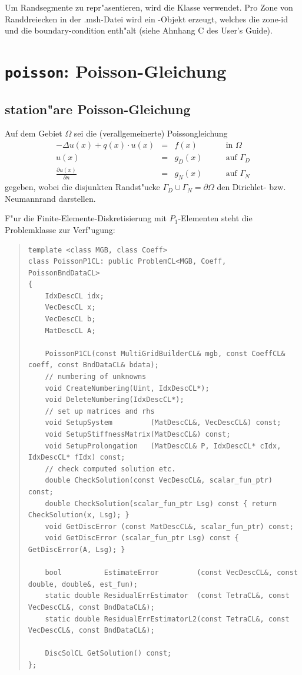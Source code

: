\documentclass[11pt,a4paper]{article}
\newenvironment{Code}{\begin{quote}\scriptsize}{\end{quote}}
\begin{document}
Um Randsegmente zu repr"asentieren, wird die Klasse  verwendet.
Pro Zone von Randdreiecken in der .msh-Datei wird ein -Objekt
erzeugt, welches die zone-id und die boundary-condition enth"alt (siehe Ahnhang C des
User's Guide).

\section{{\tt poisson}: Poisson-Gleichung}

\subsection{station"are Poisson-Gleichung}

Auf dem Gebiet $\Omega$ sei die (verallgemeinerte) Poissongleichung
\[
\begin{array}{rcll}
    -\Delta u(x) + q(x)\cdot u(x) &=& f(x) & \qquad\mbox{in }\Omega\\
    u(x) &=& g_D(x) & \qquad\mbox{auf }\Gamma_D\\
    \frac{\partial u(x)}{\partial n} &=& g_N(x) & \qquad\mbox{auf }\Gamma_N
\end{array}
\]
gegeben, wobei die disjunkten Randst"ucke $\Gamma_D\cup\Gamma_N=\partial\Omega$
den Dirichlet- bzw. Neumannrand darstellen.

F"ur die Finite-Elemente-Diskretisierung mit $P_1$-Elementen steht die
Problemklasse  zur Verf"ugung:
\begin{Code}
\begin{verbatim}
template <class MGB, class Coeff>
class PoissonP1CL: public ProblemCL<MGB, Coeff, PoissonBndDataCL>
{
    IdxDescCL idx;
    VecDescCL x;
    VecDescCL b;
    MatDescCL A;
    
    PoissonP1CL(const MultiGridBuilderCL& mgb, const CoeffCL& coeff, const BndDataCL& bdata);
    // numbering of unknowns
    void CreateNumbering(Uint, IdxDescCL*);
    void DeleteNumbering(IdxDescCL*);
    // set up matrices and rhs
    void SetupSystem         (MatDescCL&, VecDescCL&) const;
    void SetupStiffnessMatrix(MatDescCL&) const;
    void SetupProlongation   (MatDescCL& P, IdxDescCL* cIdx, IdxDescCL* fIdx) const;
    // check computed solution etc.
    double CheckSolution(const VecDescCL&, scalar_fun_ptr) const;
    double CheckSolution(scalar_fun_ptr Lsg) const { return CheckSolution(x, Lsg); }
    void GetDiscError (const MatDescCL&, scalar_fun_ptr) const;
    void GetDiscError (scalar_fun_ptr Lsg) const { GetDiscError(A, Lsg); }

    bool          EstimateError         (const VecDescCL&, const double, double&, est_fun);
    static double ResidualErrEstimator  (const TetraCL&, const VecDescCL&, const BndDataCL&);
    static double ResidualErrEstimatorL2(const TetraCL&, const VecDescCL&, const BndDataCL&);

    DiscSolCL GetSolution() const;
};
\end{verbatim}
\end{Code}
\end{document}
